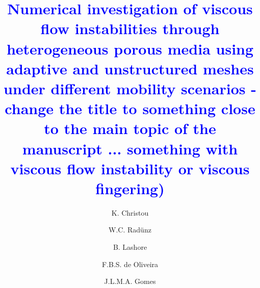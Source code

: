 \documentclass[preprint,authoryear,12pt]{elsarticle}
\newcommand{\blue}{\textcolor{blue}}
\begin{document}
\begin{frontmatter}



\title{ \blue{Numerical investigation of viscous flow instabilities through heterogeneous porous media using adaptive and unstructured meshes under different mobility scenarios - change the title to something close to the main topic of the manuscript ... something with viscous flow instability or viscous fingering)}}

\author[UoA]{K. Christou} \author[UoA,UFRGS]{W.C. Rad\"unz}  \author[UoA]{B. Lashore} \author[UESC]{F.B.S. de Oliveira}
\author[UoA]{J.L.M.A. Gomes}

\address[UoA]{Environmental and Industrial Fluid Mechanics Group, School of Engineering, University of Aberdeen, UK}
\address[UFRGS]{Engineering School, Federal University of Rio Grande do Sul, Brazil}
\address[UESC]{Department of Exact and Technological Sciences, State University of Santa Cruz, Bahia, Brazil}


\end{frontmatter}
\end{document}

